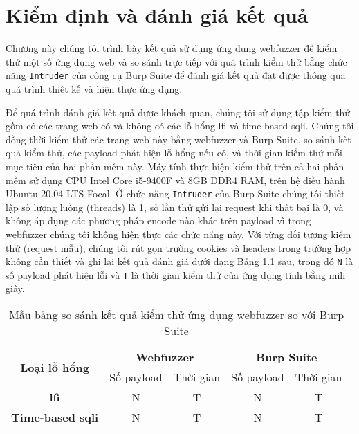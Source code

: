 \chapter{Kiểm định và đánh giá kết quả}
Chương này chúng tôi trình bày kết quả sử dụng ứng dụng webfuzzer để kiểm thử một số ứng dụng web và so sánh trực tiếp với quá trình kiểm thử bằng chức năng \texttt{Intruder} của công cụ Burp Suite để đánh giá kết quả đạt được thông qua quá trình thiêt kế và hiện thực ứng dụng.\par
Để quá trình đánh giá kết quả được khách quan, chúng tôi sử dụng tập kiểm thử gồm có các trang web có và không có các lỗ hổng \acrshort{lfi} và time-based \acrshort{sqli}. Chúng tôi đồng thời kiểm thử các trang web này bằng webfuzzer và Burp Suite, so sánh kết quả kiểm thử, các payload phát hiện lỗ hổng nếu có, và thời gian kiểm thử mỗi mục tiêu của hai phần mềm này. Máy tính thực hiện kiểm thử trên cả hai phần mềm sử dụng CPU Intel Core i5-9400F và 8GB DDR4 RAM, trên hệ điều hành Ubuntu 20.04 LTS Focal. Ở chức năng \texttt{Intruder} của Burp Suite chúng tôi thiết lập số lượng luồng (threads) là 1, số lần thử gửi lại request khi thất bại là 0, và không áp dụng các phương pháp encode nào khác trên payload vì trong webfuzzer chúng tôi không hiện thực các chức năng này. Với từng đối tượng kiểm thử (request mẫu), chúng tôi rút gọn trường cookies và headers trong trường hợp không cần thiết và ghi lại kết quả đánh giá dưới dạng Bảng \ref{tab:sample-testing-results} sau, trong đó \texttt{N} là số payload phát hiện lỗi và \texttt{T} là thời gian kiểm thử của ứng dụng tính bằng mili giây.
\FloatBarrier
\begin{table}[ht]
    \centering
    \caption{Mẫu bảng so sánh kết quả kiểm thử ứng dụng webfuzzer so với Burp Suite}
    \label{tab:sample-testing-results}
    \begin{tabular}[ht]{ccccc}
        \toprule[1pt]\midrule[0.3pt]
            \multirow{2}{*}{\textbf{Loại lỗ hổng}}&\multicolumn{2}{c}{\textbf{Webfuzzer}}&\multicolumn{2}{c}{\textbf{Burp Suite}}\\
            \cmidrule(lr){2-3}\cmidrule(lr){4-5}{}&Số payload&Thời gian&Số payload&Thời gian\\
        \midrule[0.3pt]
            \textbf{\acrshort{lfi}}&N&T&N&T\\\addlinespace
            \textbf{Time-based \acrshort{sqli}}&N&T&N&T\\
        \midrule[0.3pt]\bottomrule[1pt]
    \end{tabular}
\end{table}
